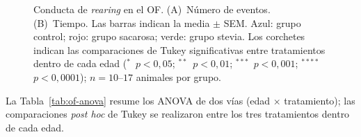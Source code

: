 \begin{figure}[htbp]
  \centering
  \caption[Conducta de \textit{rearing} en el OF]{Conducta de \textit{rearing} en el OF. (A)~Número de eventos. (B)~Tiempo. Las barras indican la media $\pm$ SEM. Azul: grupo control; rojo: grupo sacarosa; verde: grupo stevia. Los corchetes indican las comparaciones de Tukey significativas entre tratamientos dentro de cada edad ($^{*}$~$p < 0{,}05$; $^{**}$~$p < 0{,}01$; $^{***}$~$p < 0{,}001$; $^{****}$~$p < 0{,}0001$); $n = 10$--$17$ animales por grupo.}
  \label{fig:of-rearing}
\end{figure}

La Tabla~\ref{tab:of-anova} resume los ANOVA de dos vías (edad $\times$ tratamiento); las comparaciones \textit{post hoc} de Tukey se realizaron entre los tres tratamientos dentro de cada edad.


